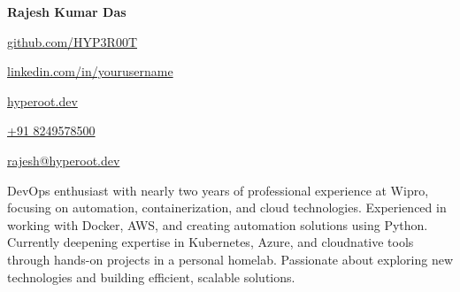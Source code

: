 \begin{center}
  \textbf{Rajesh Kumar Das}
\end{center}

\noindent
\href{https://github.com/HYP3R00T}{github.com/HYP3R00T}

\noindent
\href{https://linkedin.com/in/yourusername}{linkedin.com/in/yourusername}

\noindent
\href{https://hyperoot.dev}{hyperoot.dev}

\noindent
\href{tel:+91 8249578500}{+91 8249578500}

\noindent
\href{mailto:rajesh@hyperoot.dev}{rajesh@hyperoot.dev}

\noindent
DevOps enthusiast with nearly two years of professional experience at Wipro, focusing on automation, containerization, and cloud technologies. Experienced in working with Docker, AWS, and creating automation solutions using Python. Currently deepening expertise in Kubernetes, Azure, and cloudnative tools through hands-on projects in a personal homelab. Passionate about exploring new technologies and building efficient, scalable solutions.
